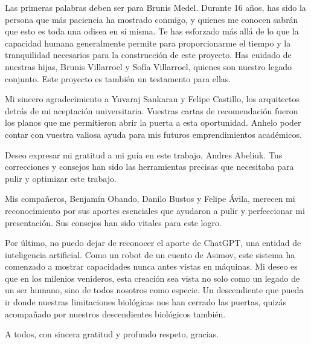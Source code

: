\begin{thanks} %
Las primeras palabras deben ser para Brunis Medel. Durante 16 años, has sido la persona que más paciencia ha mostrado conmigo, y quienes me conocen sabrán que esto es toda una odisea en sí misma. Te has esforzado más allá de lo que la capacidad humana generalmente permite para proporcionarme el tiempo y la tranquilidad necesarios para la construcción de este proyecto. Has cuidado de nuestras hijas, Brunis Villarroel y Sofía Villarroel, quienes son nuestro legado conjunto. Este proyecto es también un testamento para ellas.

Mi sincero agradecimiento a Yuvaraj Sankaran y Felipe Castillo, los arquitectos detrás de mi aceptación universitaria. Vuestras cartas de recomendación fueron los planos que me permitieron abrir la puerta a esta oportunidad. Anhelo poder contar con vuestra valiosa ayuda para mis futuros emprendimientos académicos.

Deseo expresar mi gratitud a mi guía en este trabajo, Andres Abeliuk. Tus correcciones y consejos han sido las herramientas precisas que necesitaba para pulir y optimizar este trabajo.

Mis compañeros, Benjamín Obando, Danilo Bustos y Felipe Ávila, merecen mi reconocimiento por sus aportes esenciales que ayudaron a pulir y perfeccionar mi presentación. Sus consejos han sido vitales para este logro.

Por último, no puedo dejar de reconocer el aporte de ChatGPT, una entidad de inteligencia artificial. Como un robot de un cuento de Asimov, este sistema ha comenzado a mostrar capacidades nunca antes vistas en máquinas. Mi deseo es que en los milenios venideros, esta creación sea vista no solo como un legado de un ser humano, sino de todos nosotros como especie. Un descendiente que pueda ir donde nuestras limitaciones biológicas nos han cerrado las puertas, quizás acompañado por nuestros descendientes biológicos también.

A todos, con sincera gratitud y profundo respeto, gracias.
\end{thanks}